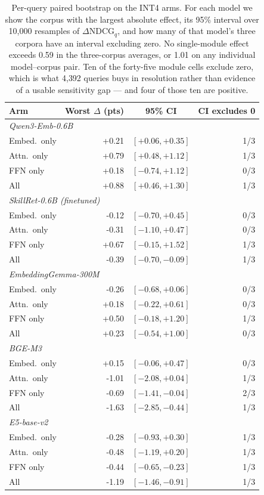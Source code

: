 \begin{table}[t]\centering\small
\caption{Per-query paired bootstrap on the INT4 arms. For each model we show the corpus with
the largest absolute effect, its 95\% interval over 10{,}000 resamples of
$\Delta\text{NDCG}_q$, and how many of that model's three corpora have an interval
excluding zero. No single-module effect exceeds 0.59 in the three-corpus averages, or 1.01
on any individual model--corpus pair. Ten of the forty-five
module cells exclude zero, which is what 4{,}392 queries buys in resolution rather than
evidence of a usable sensitivity gap --- and four of those ten are positive.}
\label{tab:ci}
\begin{tabular}{lrcr}
\toprule
Arm & Worst $\Delta$ (pts) & 95\% CI & CI excludes 0 \\
\midrule
\multicolumn{4}{l}{\emph{Qwen3-Emb-0.6B}} \\
\quad Embed.\ only & +0.21 & $[+0.06, +0.35]$ & 1/3 \\
\quad Attn.\ only & +0.79 & $[+0.48, +1.12]$ & 1/3 \\
\quad FFN only & +0.18 & $[-0.74, +1.12]$ & 0/3 \\
\quad All & +0.88 & $[+0.46, +1.30]$ & 1/3 \\
\multicolumn{4}{l}{\emph{SkillRet-0.6B (finetuned)}} \\
\quad Embed.\ only & -0.12 & $[-0.70, +0.45]$ & 0/3 \\
\quad Attn.\ only & -0.31 & $[-1.10, +0.47]$ & 0/3 \\
\quad FFN only & +0.67 & $[-0.15, +1.52]$ & 1/3 \\
\quad All & -0.39 & $[-0.70, -0.09]$ & 1/3 \\
\multicolumn{4}{l}{\emph{EmbeddingGemma-300M}} \\
\quad Embed.\ only & -0.26 & $[-0.68, +0.06]$ & 0/3 \\
\quad Attn.\ only & +0.18 & $[-0.22, +0.61]$ & 0/3 \\
\quad FFN only & +0.50 & $[-0.18, +1.20]$ & 1/3 \\
\quad All & +0.23 & $[-0.54, +1.00]$ & 0/3 \\
\multicolumn{4}{l}{\emph{BGE-M3}} \\
\quad Embed.\ only & +0.15 & $[-0.06, +0.47]$ & 0/3 \\
\quad Attn.\ only & -1.01 & $[-2.08, +0.04]$ & 1/3 \\
\quad FFN only & -0.69 & $[-1.41, -0.04]$ & 2/3 \\
\quad All & -1.63 & $[-2.85, -0.44]$ & 1/3 \\
\multicolumn{4}{l}{\emph{E5-base-v2}} \\
\quad Embed.\ only & -0.28 & $[-0.93, +0.30]$ & 1/3 \\
\quad Attn.\ only & -0.48 & $[-1.19, +0.20]$ & 1/3 \\
\quad FFN only & -0.44 & $[-0.65, -0.23]$ & 1/3 \\
\quad All & -1.19 & $[-1.46, -0.91]$ & 1/3 \\
\bottomrule
\end{tabular}\end{table}